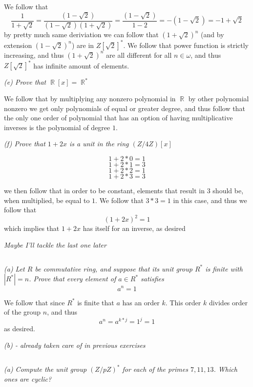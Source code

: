 \documentclass[11pt,oneside,titlepage]{book}
\DeclareMathOperator \real {\mathbb {R}}
\begin{document}
We follow that
$$\frac{1}{1 + \sqrt{2}} =
\frac{(1 - \sqrt{2})}{(1 - \sqrt{2})(1 + \sqrt{2})} =
\frac{(1 - \sqrt{2})}{1 - 2} = -(1 - \sqrt{2}) = -1 + \sqrt{2}$$ by
pretty much same deriviation we can follow that $(1 + \sqrt{2})^n$
(and by extension $(1 - \sqrt{2})^n$) are in $Z[\sqrt{2}]^*$.
We follow that power function is strictly increasing, and thus
$(1 + \sqrt{2})^n$ are all different for all $n \in \omega$, and
thus $Z[\sqrt{2}]^*$ has infinite amount of elements.

\textit{(e) Prove that $\real[x] = \real^*$}

We follow that by multiplying any nonzero polynomial in $\real$ by
other polynomial nonzero we get only polynomials of equal or greater
degree, and thus follow that the only one order of polynomial that
has an option of having multiplicative inverses is the polynomial of
degree $1$.

\textit{(f) Prove that $1 + 2x$ is a unit in the ring $(Z/4Z)[x]$ }

$$1 + 2 * 0 = 1$$
$$1 + 2 * 1 = 3$$
$$1 + 2 * 2 = 1$$
$$1 + 2 * 3 = 3$$

we then follow that in order to be constant, elements that result in
$3$ should be, when multiplied, be equal to $1$. We follow that
$3 * 3 = 1$ in this case, and thus we follow that
$$(1 + 2x)^2 = 1$$
which implies that $1 + 2x$ has itself for an inverse, as desired

\textit{Maybe I'll tackle the last one later}

\subsection{}

\textit{(a) Let $R$ be commutative ring, and suppose that its unit
  group $R^*$ is finite with $|R^*| = n$. Prove that every element of $a
  \in R^*$ satisfies
  $$a^n = 1$$
}

We follow that since $R^*$ is finite that $a$ has an order $k$. This
order $k$ divides order of the group $n$, and thus
$$a^n = a^{k * j} = 1^j = 1$$
as desired.

\textit{(b) - already taken care of in previous exercises}

\subsection{}

\textit{(a) Compute the unit group $(Z/pZ)^*$ for each of the primes
  $7, 11, 13$. Which ones are cyclic? }
\end{document}
